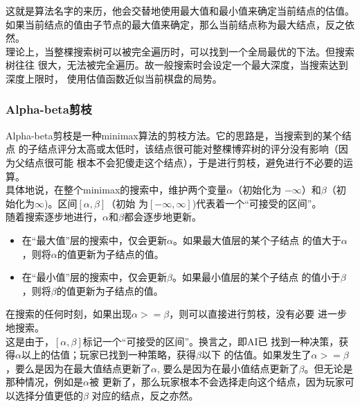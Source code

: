 \documentclass[a4paper]{article}
\begin{document}
这就是算法名字的来历，他会交替地使用最大值和最小值来确定当前结点的估值。
如果当前结点的值由子节点的最大值来确定，那么当前结点称为最大结点，反之依然。\\

理论上，当整棵搜索树可以被完全遍历时，可以找到一个全局最优的下法。但搜索树往往
很大，无法被完全遍历。故一般搜索时会设定一个最大深度，当搜索达到深度上限时，
使用估值函数近似当前棋盘的局势。
\subsubsection{Alpha-beta剪枝}
Alpha-beta剪枝是一种minimax算法的剪枝方法。它的思路是，当搜索到的某个结点
的子结点评分太高或太低时，该结点很可能对整棵博弈树的评分没有影响（因为父结点很可能
根本不会犯傻走这个结点），于是进行剪枝，避免进行不必要的运算。\\

具体地说，在整个minimax的搜索中，维护两个变量$\alpha$（初始化为
$-\infty$）和$\beta$（初始化为$\infty$)。区间$[\alpha, \beta]$（初始
为$[-\infty, \infty]$)代表着一个``可接受的区间''。
\\

随着搜索逐步地进行，$\alpha$和$\beta$都会逐步地更新。
\begin{itemize}
    \item 在``最大值''层的搜索中，仅会更新$\alpha$。如果最大值层的某个子结点
    的值大于$\alpha$，则将$\alpha$的值更新为子结点的值。
    \item 在``最小值''层的搜索中，仅会更新$\beta$。如果最小值层的某个子结点
    的值小于$\beta$，则将$\beta$的值更新为子结点的值。
\end{itemize}
在搜索的任何时刻，如果出现$\alpha >= \beta$，则可以直接进行剪枝，没有必要
进一步地搜索。\\

这是由于，$[\alpha, \beta]$标记一个``可接受的区间''。换言之，即AI已
找到一种决策，获得$\alpha$以上的估值；玩家已找到一种策略，获得$\beta$以下
的估值。如果发生了$\alpha >= \beta$，要么是因为在最大值结点更新了$\alpha$,
要么是因为在最小值结点更新了$\beta$。但无论是那种情况，例如是$\alpha$被
更新了，那么玩家根本不会选择走向这个结点，因为玩家可以选择分值更低的$\beta$
对应的结点，反之亦然。\\
\end{document}
